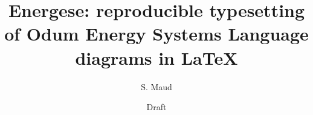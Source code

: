 
\documentclass[11pt,a4paper]{article}
\usepackage[margin=1in]{geometry}
\usepackage{graphicx}
\usepackage{subcaption}
\usepackage{booktabs}
\usepackage{listings}
\usepackage{natbib}
\usepackage{energese}
\usepackage{hyperref}

\graphicspath{{tests/fidelity/out/}{reference-images/}%
              {../tests/fidelity/out/}{../reference-images/}}

\lstset{basicstyle=\ttfamily\footnotesize, columns=fullflexible,
        breaklines=true, frame=single, framesep=4pt, xleftmargin=6pt}

\title{Energese: reproducible typesetting of Odum Energy Systems Language
       diagrams in \LaTeX}
\author{S. Maud}
\date{Draft}


\maketitle

\begin{abstract}
[OUTLINE] State the problem: Energy Systems Language diagrams are drawn by hand
in general-purpose vector tools, so they are not reproducible, not
version-controllable, not generated from the models they depict, and drift from
Odum's published symbol conventions. State the contribution: \texttt{energese},
a Lua\LaTeX{} package that renders ESL diagrams from a declarative model, in
either JSON or \TeX, through a single layout engine; and a two-tier fidelity
method that makes conformance to Odum's symbols a machine-checked property
rather than a matter of opinion. State the result quantitatively: all nine
implemented symbols agree with geometry measured from Odum's published sheet to
within measurement precision on two independent invariants, and the two
authoring front ends are verified to produce byte-identical raster output for
models up to and including a complete published figure. State the availability: CTAN, with the
model format shared with the GSSK simulation kernel so one file both simulates
and draws.
\end{abstract}


